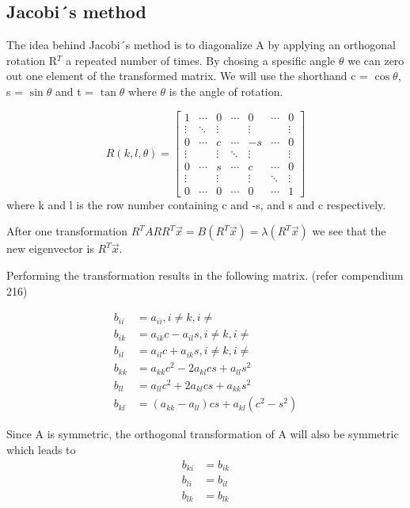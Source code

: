 \subsection{Jacobi´s method}

The idea behind Jacobi´s method is to diagonalize A by applying an orthogonal
rotation R$^T$ a repeated number of times. By chosing a spesific angle $\theta$
we can zero out one element of the transformed matrix. We will use the shorthand
c = $\cos{\theta}$, s = $\sin{\theta}$ and t = $\tan{\theta}$ where $\theta$ is
the angle of rotation.


$$R(k,l,\theta) =
\begin{bmatrix}
  1       & \cdots  & 0       & \cdots  & 0       & \cdots  & 0 \\
  \vdots  & \ddots  &  \vdots &         & \vdots  &         & \vdots \\
  0       & \cdots  & c       & \cdots  & -s      & \cdots  & 0 \\
  \vdots  &         & \vdots  & \ddots  & \vdots  &         & \vdots\\
  0       & \cdots  & s       & \cdots  & c       & \cdots  & 0\\
  \vdots  &         & \vdots  &         &  \vdots & \ddots  & \vdots\\
  0       & \cdots  & 0       & \cdots  & 0       & \cdots  & 1
\end{bmatrix}
$$
where k and l is the row number containing c and -s, and s and c respectively.


After one transformation $R^T A R R^T \vec{x} = B (R^T \vec{x}) = \lambda (R^T
\vec{x})$ we see that the new eigenvector is $R^T\vec{x}$.

Performing the transformation results in the following matrix.
(refer compendium 216)

\begin{align}
  b_{ii} &= a_{ii}, i \neq k, i \neq \\
  b_{ik} &= a_{ik}c - a_{il}s, i \neq k, i \neq \\
  b_{il} &= a_{il}c + a_{ik}s, i \neq k, i \neq \\
  b_{kk} &= a_{kk}c^2 - 2a_{kl}cs + a_{ll}s^2 \\
  b_{ll} &= a_{ll}c^2 + 2a_{kl}cs + a_{kk}s^2 \\
  b_{kl} &= (a_{kk}- a_{ll})cs + a_{kl}(c^2 - s^2)
\end{align}

Since A is symmetric, the orthogonal transformation of A will also be symmetric
which leads to
\begin{align}
  b_{ki} &= b_{ik} \\
  b_{li} &= b_{il} \\
  b_{lk} &= b_{lk}
\end{align}

